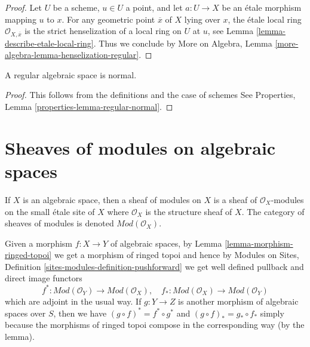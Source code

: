 \begin{proof}
Let $U$ be a scheme, $u \in U$ a point, and let $a : U \to X$ be an
\'etale morphism mapping $u$ to $x$. For any geometric point
$\overline{x}$ of $X$ lying over $x$, the \'etale local
ring $\mathcal{O}_{X, \overline{x}}$ is the strict henselization of
a local ring on $U$ at $u$, see
Lemma \ref{lemma-describe-etale-local-ring}.
Thus we conclude by
More on Algebra, Lemma \ref{more-algebra-lemma-henselization-regular}.
\end{proof}

\begin{lemma}
\label{lemma-regular-normal}
A regular algebraic space is normal.
\end{lemma}

\begin{proof}
This follows from the definitions and the case of schemes
See Properties, Lemma \ref{properties-lemma-regular-normal}.
\end{proof}

 








\section{Sheaves of modules on algebraic spaces}
\label{section-modules}

\noindent
If $X$ is an algebraic space, then a sheaf of modules on $X$ is
a sheaf of $\mathcal{O}_X$-modules on the small \'etale site of $X$
where $\mathcal{O}_X$ is the structure sheaf of $X$. The category
of sheaves of modules is denoted $\textit{Mod}(\mathcal{O}_X)$.

\medskip\noindent
Given a morphism $f : X \to Y$ of algebraic spaces, by
Lemma \ref{lemma-morphism-ringed-topoi}
we get a morphism of ringed topoi and hence by
Modules on Sites, Definition \ref{sites-modules-definition-pushforward}
we get well defined pullback and direct image functors
\begin{equation}
\label{equation-push-pull}
f^* :
\textit{Mod}(\mathcal{O}_Y)
\longrightarrow
\textit{Mod}(\mathcal{O}_X), \quad
f_* :
\textit{Mod}(\mathcal{O}_X)
\longrightarrow
\textit{Mod}(\mathcal{O}_Y)
\end{equation}
which are adjoint in the usual way. If $g : Y \to Z$ is another morphism
of algebraic spaces over $S$, then we have
$(g \circ f)^* = f^* \circ g^*$ and $(g \circ f)_* = g_* \circ f_*$
simply because the morphisms of ringed topoi compose in the corresponding
way (by the lemma).

